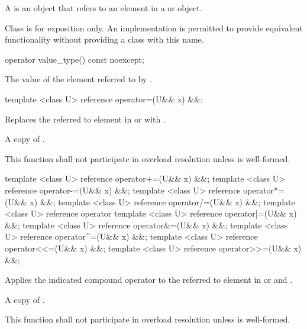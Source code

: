 \label{sec:reference type}
\pnum A  is an object that refers to an element in a \simd or \mask object.

\pnum Class  is for exposition only.
An implementation is permitted to provide equivalent functionality without providing a class with this name.



\begin{itemdecl}
operator value_type() const noexcept;
\end{itemdecl}
\begin{itemdescr}
  \pnum\returns The value of the element referred to by .
\end{itemdescr}

\begin{itemdecl}
template <class U> reference operator=(U&& x) &&;
\end{itemdecl}
\begin{itemdescr}
  \pnum\effects Replaces the referred to element in \simd or \mask with .

  \pnum\returns A copy of .

  \pnum\remarks This function shall not participate in overload resolution unless  is well-formed.
\end{itemdescr}

\begin{itemdecl}
template <class U> reference operator+=(U&& x) &&;
template <class U> reference operator-=(U&& x) &&;
template <class U> reference operator*=(U&& x) &&;
template <class U> reference operator/=(U&& x) &&;
template <class U> reference operator%
template <class U> reference operator|=(U&& x) &&;
template <class U> reference operator&=(U&& x) &&;
template <class U> reference operator^=(U&& x) &&;
template <class U> reference operator<<=(U&& x) &&;
template <class U> reference operator>>=(U&& x) &&;
\end{itemdecl}
\begin{itemdescr}
  \pnum\effects Applies the indicated compound operator to the referred to element in \simd or \mask and .

  \pnum\returns A copy of .

  \pnum\remarks This function shall not participate in overload resolution unless  is well-formed.
\end{itemdescr}

